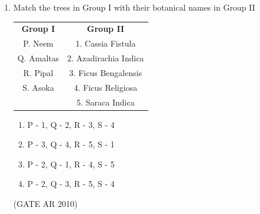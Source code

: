 \documentclass[journal]{IEEEtran}
\begin{document}
\begin{enumerate}
\item Match the trees in Group I with their botanical names in Group II

\begin{table}[H]
\centering
\begin{tabular}{cc}
\textbf{Group I} & \textbf{Group II} \\
P. Neem & 1. Cassia Fistula \\
Q. Amaltas & 2. Azadirachia Indica \\
R. Pipal & 3. Ficus Bengalensis \\
S. Asoka & 4. Ficus Religiosa \\
& 5. Saraca Indica \\
\end{tabular}
\end{table}

\begin{multicols}{2}
\begin{enumerate}
\item P - 1, Q - 2, R - 3, S - 4
\item P - 3, Q - 4, R - 5, S - 1
\item P - 2, Q - 1, R - 4, S - 5
\item P - 2, Q - 3, R - 5, S - 4
\end{enumerate}
\end{multicols}
\hfill (GATE AR 2010)


\end{enumerate}
\end{document}

